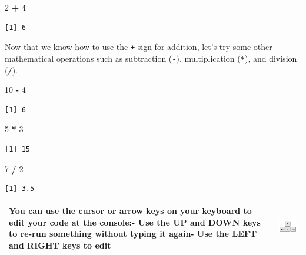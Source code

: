 \documentclass[]{book}
\newenvironment{Shaded}{\begin{snugshade}}{\end{snugshade}}
\newcommand{\DecValTok}[1]{\textcolor[rgb]{0.00,0.00,0.81}{#1}}
\newcommand{\StringTok}[1]{\textcolor[rgb]{0.31,0.60,0.02}{#1}}
\newcommand{\OperatorTok}[1]{\textcolor[rgb]{0.81,0.36,0.00}{\textbf{#1}}}
\theoremstyle{definition}
\theoremstyle{definition}
\theoremstyle{definition}
\theoremstyle{remark}
\begin{document}
\begin{Shaded}
\begin{Highlighting}[]
\DecValTok{2} \OperatorTok{+}\StringTok{ }\DecValTok{4}
\end{Highlighting}
\end{Shaded}

\begin{verbatim}
[1] 6
\end{verbatim}

Now that we know how to use the \texttt{+} sign for addition, let's try
some other mathematical operations such as subtraction (\texttt{-}),
multiplication (\texttt{*}), and division (\texttt{/}).

\begin{Shaded}
\begin{Highlighting}[]
\DecValTok{10} \OperatorTok{-}\StringTok{ }\DecValTok{4}
\end{Highlighting}
\end{Shaded}

\begin{verbatim}
[1] 6
\end{verbatim}

\begin{Shaded}
\begin{Highlighting}[]
\DecValTok{5} \OperatorTok{*}\StringTok{ }\DecValTok{3}
\end{Highlighting}
\end{Shaded}

\begin{verbatim}
[1] 15
\end{verbatim}

\begin{Shaded}
\begin{Highlighting}[]
\DecValTok{7} \OperatorTok{/}\StringTok{ }\DecValTok{2}
\end{Highlighting}
\end{Shaded}

\begin{verbatim}
[1] 3.5
\end{verbatim}

\begin{longtable}[]{@{}ll@{}}
\toprule
\begin{minipage}[t]{0.69\columnwidth}\raggedright\strut
You can use the cursor or arrow keys on your keyboard to edit your code
at the console:- Use the UP and DOWN keys to re-run something without
typing it again- Use the LEFT and RIGHT keys to edit\strut
\end{minipage} & \begin{minipage}[t]{0.25\columnwidth}\raggedright\strut
\includegraphics{./img/rstudio_cursorkeys.png}\strut
\end{minipage}\tabularnewline
\bottomrule
\end{longtable}
\end{document}
